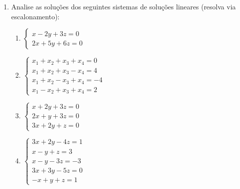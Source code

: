 \documentclass[oneside,a4paper,12pt]{article}
\begin{document}
\begin{enumerate}
	\item Analise as soluções dos seguintes sistemas de soluções lineares (resolva via escalonamento):
	\begin{multicols}{2}
		\begin{enumerate}
			\item $\begin{cases}
			x - 2y + 3z = 0 \\
			2x + 5y + 6z = 0
			\end{cases}$
			\item $\begin{cases}
			x_1 + x_2 + x_3 + x_4 = 0 \\
			x_1 + x_2 + x_3 - x_4 = 4 \\
			x_1 + x_2 - x_3 + x_4 = -4 \\
			x_1 - x_2 + x_3 + x_4 = 2 
			\end{cases}$
			\item $\begin{cases}
			x+2y+3z = 0 \\
			2x +y + 3z = 0 \\
			3x + 2y + z = 0
			\end{cases}$
			\item $\begin{cases}
			3x + 2y - 4z = 1 \\
			x - y + z = 3 \\
			x - y - 3z = -3 \\
			3x + 3y - 5z = 0 \\
			-x + y +z = 1
			\end{cases}$
		\end{enumerate}	
	\end{multicols}		
		

\end{enumerate}
\end{document}
